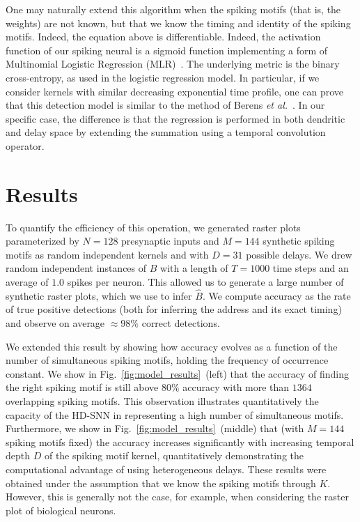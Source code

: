 \documentclass[runningheads]{llncs}
\newcommand{\kernel}{K} %
\newcommand{\fig}[1]{Fig.~\ref{fig:#1}}%
\begin{document}
One may naturally extend this algorithm when the spiking motifs (that is, the weights) are not known, but that we know the timing and identity of the spiking motifs. Indeed, the equation above is differentiable. Indeed, the activation function of our spiking neural is a sigmoid function implementing a form of  Multinomial Logistic Regression (MLR)~\cite{grimaldi_learning_2023}.  
The underlying metric is the binary cross-entropy, as used in the logistic regression model. In particular, if we consider kernels with similar decreasing exponential time profile, one can prove that this detection model is similar to the method of Berens {\it et al.}~\cite{berens_fast_2012}. In our specific case, the difference is that the regression is performed in both dendritic and delay space by extending the summation using a temporal convolution operator. 
%
\section{Results}
%
To quantify the efficiency of this operation, we generated raster plots parameterized by $N=128$ presynaptic inputs and $M=144$ synthetic spiking motifs as random independent kernels and with $D=31$ possible delays. We drew random independent instances of $B$ with a length of $T=1000$ time steps and an average of $1.0$ spikes per neuron. This allowed us to generate a large number of synthetic raster plots, which we use to infer $\hat{B}$. We compute accuracy as the rate of true positive detections (both for inferring the address and its exact timing) and observe on average $\approx 98\%$ correct detections.

We extended this result by showing how accuracy evolves as a function of the number of simultaneous spiking motifs, holding the frequency of occurrence constant. We show in \fig{model_results}~(left) that the accuracy of finding the right spiking motif is still above $80\%$ accuracy with more than $1364$ overlapping spiking motifs. This observation illustrates quantitatively the capacity  of the HD-SNN in representing a high number of simultaneous motifs. Furthermore, we show in \fig{model_results}~(middle) that (with $M=144$ spiking motifs fixed) the accuracy increases significantly with increasing temporal depth $D$ of the spiking motif kernel, quantitatively demonstrating the computational advantage of using heterogeneous delays. These results were obtained under the assumption that we know the spiking motifs through $\kernel$. However, this is generally not the case, for example, when considering the raster plot of biological neurons.
\end{document}

